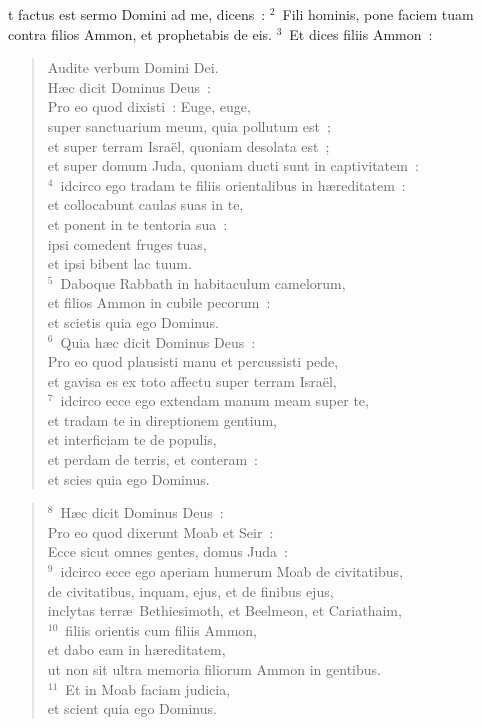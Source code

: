 \bchapter
{}t factus est sermo Domini ad me, dicens~:
${}^{2}$~Fili hominis, pone faciem tuam contra filios Ammon, et prophetabis de eis.
${}^{3}$~Et dices filiis Ammon~: \begin{verse}Audite verbum Domini Dei.\\ H\ae c dicit Dominus Deus~:\\ Pro eo quod dixisti~: Euge, euge,\\ super sanctuarium meum, quia pollutum est~;\\ et super terram Isra\"el, quoniam desolata est~;\\ et super domum Juda, quoniam ducti sunt in captivitatem~:\\
${}^{4}$~idcirco ego tradam te filiis orientalibus in h\ae reditatem~:\\ et collocabunt caulas suas in te,\\ et ponent in te tentoria sua~:\\ ipsi comedent fruges tuas,\\ et ipsi bibent lac tuum.\\
${}^{5}$~Daboque Rabbath in habitaculum camelorum,\\ et filios Ammon in cubile pecorum~:\\ et scietis quia ego Dominus.\\
${}^{6}$~Quia h\ae c dicit Dominus Deus~:\\ Pro eo quod plausisti manu et percussisti pede,\\ et gavisa es ex toto affectu super terram Isra\"el,\\
${}^{7}$~idcirco ecce ego extendam manum meam super te,\\ et tradam te in direptionem gentium,\\ et interficiam te de populis,\\ et perdam de terris, et conteram~:\\ et scies quia ego Dominus.\end{verse}


\begin{verse}${}^{8}$~H\ae c dicit Dominus Deus~:\\ Pro eo quod dixerunt Moab et Seir~:\\ Ecce sicut omnes gentes, domus Juda~:\\
${}^{9}$~idcirco ecce ego aperiam humerum Moab de civitatibus,\\ de civitatibus, inquam, ejus, et de finibus ejus,\\ inclytas terr\ae\ Bethiesimoth, et Beelmeon, et Cariathaim,\\
${}^{10}$~filiis orientis cum filiis Ammon,\\ et dabo eam in h\ae reditatem,\\ ut non sit ultra memoria filiorum Ammon in gentibus.\\
${}^{11}$~Et in Moab faciam judicia,\\ et scient quia ego Dominus.\end{verse}



